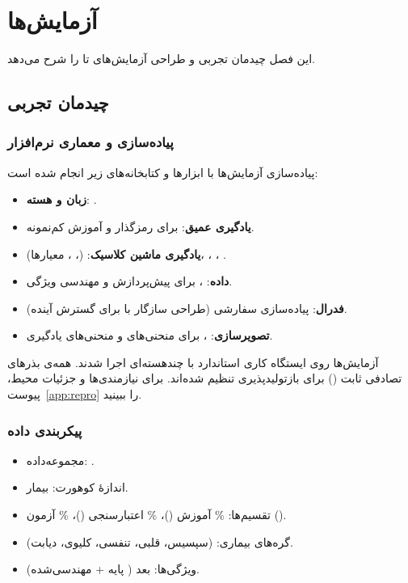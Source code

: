 \chapter{آزمایش‌ها}
\label{ch:experiments}

این فصل چیدمان تجربی و طراحی آزمایش‌های  تا  را شرح می‌دهد.

\section{چیدمان تجربی}

\subsection{پیاده‌سازی و معماری نرم‌افزار}

پیاده‌سازی آزمایش‌ها با ابزارها و کتابخانه‌های زیر انجام شده است:

\begin{itemize}
\item \textbf{زبان و هسته}: .
\item \textbf{یادگیری عمیق}:  برای رمزگذار  و آموزش کم‌نمونه.
\item \textbf{یادگیری ماشین کلاسیک}:  (، ، معیارها)، ، ، .
\item \textbf{داده}: ،  برای پیش‌پردازش و مهندسی ویژگی.
\item \textbf{فدرال}: پیاده‌سازی سفارشی  (طراحی سازگار با  برای گسترش آینده).
\item \textbf{تصویرسازی}: ،  برای منحنی‌های  و منحنی‌های یادگیری.
\end{itemize}

آزمایش‌ها روی ایستگاه کاری استاندارد با  چندهسته‌ای اجرا شدند. همه‌ی بذرهای تصادفی ثابت () برای بازتولیدپذیری تنظیم شده‌اند. برای نیازمندی‌ها و جزئیات محیط، پیوست~\ref{app:repro} را ببینید.

\subsection{پیکربندی داده}

\begin{itemize}
\item مجموعه‌داده: .
\item اندازۀ کوهورت:  بیمار.
\item تقسیم‌ها: \% آموزش ()، \% اعتبارسنجی ()، \% آزمون ().
\item گره‌های بیماری:  (سپسیس، قلبی، تنفسی، کلیوی، دیابت).
\item ویژگی‌ها:  بعد ( پایه +  مهندسی‌شده).
\end{itemize}

